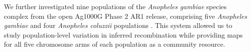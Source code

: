 We further investigated nine populations of the \textit{Anopheles gambiae} species complex from the open Ag1000G Phase 2 AR1 release, comprising five \textit{Anopheles gambiae} and four \textit{Anopheles coluzzii} populations \citep{malariagen_phase2_ar1_2017,ag1000g2020}. This system allowed us to study population-level variation in inferred recombination while providing maps for all five chromosome arms of each population as a community resource.
